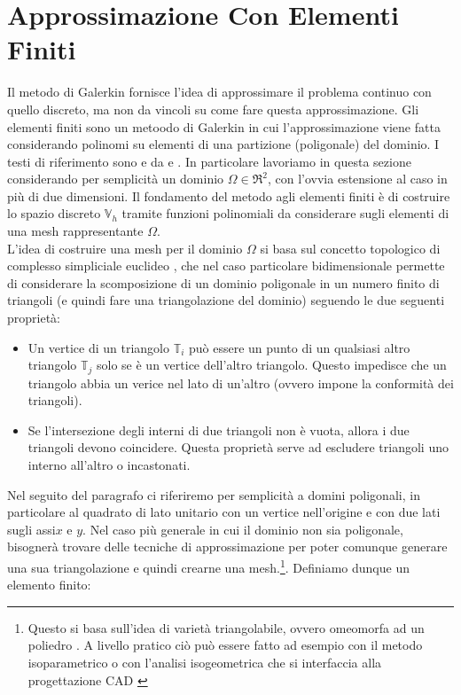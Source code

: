 \documentclass[12pt,a4paper]{report}
\theoremstyle{theorem}
\theoremstyle{definition}
\begin{document}
\section{Approssimazione Con Elementi Finiti}
Il metodo di Galerkin fornisce l'idea di approssimare il problema continuo con quello discreto, ma non da vincoli su come fare questa approssimazione. Gli elementi finiti sono un metoodo di Galerkin in cui l'approssimazione viene fatta considerando polinomi su elementi di una partizione (poligonale) del dominio. I testi di riferimento sono \cite{BS} e da \cite{Ciarlet} e \cite{Q}. In particolare lavoriamo in questa sezione considerando per semplicità un dominio $\Omega \in \Re^{2}$, con l'ovvia estensione al caso in più di due dimensioni.
Il fondamento del metodo agli elementi finiti è di costruire lo spazio discreto $\mathbb{V}_h$ tramite funzioni polinomiali da considerare sugli elementi di una mesh rappresentante $\Omega$. \\
L'idea di costruire una mesh per il dominio $\Omega$ si basa sul concetto topologico di complesso simpliciale euclideo \cite[Chapter~2]{FerrarioSimpl}, che nel caso particolare  bidimensionale permette di considerare la scomposizione di un dominio poligonale in un numero finito di triangoli (e quindi fare una triangolazione del dominio) seguendo le due seguenti proprietà:
\begin{itemize}
	\item Un vertice di un triangolo $\mathbb{T}_{i}$ può essere un punto di un qualsiasi altro triangolo $\mathbb{T}_{j}$ solo se è un vertice dell'altro triangolo. Questo impedisce che un triangolo abbia un verice nel lato di un'altro (ovvero impone la conformità dei triangoli).
	\item Se l'intersezione degli interni di due triangoli non è vuota, allora i due triangoli devono coincidere. Questa proprietà serve ad escludere triangoli uno interno all'altro o incastonati.
\end{itemize}
Nel seguito del paragrafo ci riferiremo per semplicità a domini poligonali, in particolare al quadrato di lato unitario con un vertice nell'origine e con due lati sugli assi$x$ e $y$. Nel caso più generale in cui il dominio non sia poligonale, bisognerà trovare delle tecniche di approssimazione per poter comunque generare una sua triangolazione e quindi crearne una mesh.\footnote{Questo si basa sull'idea di varietà triangolabile, ovvero omeomorfa ad un poliedro \cite[Chapter~5]{FerrarioSimpl}. A livello pratico ciò può essere fatto ad esempio con il metodo isoparametrico \cite{lenoir1986optimal} o con l'analisi isogeometrica che si interfaccia alla progettazione CAD \cite{CHYisogeometric}}. Definiamo dunque un elemento finito:
\end{document}
